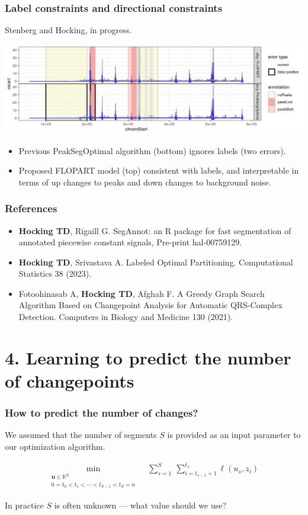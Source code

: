 \documentclass{beamer}
\newcommand{\RR}{\mathbb R}
\begin{document}
\begin{frame}
  \frametitle{Label constraints and directional constraints}
  Stenberg and Hocking, in progress.

  \includegraphics[width=\linewidth]{FLOPART-example}

  \begin{itemize}
  \item Previous PeakSegOptimal algorithm (bottom) ignores labels (two
    errors).
  \item Proposed FLOPART model (top) consistent with labels, and
    interpretable in terms of up changes to peaks and down changes to
    background noise.
  \end{itemize}
\end{frame}

\begin{frame}
  \frametitle{References}
  \scriptsize
  \begin{itemize}
  \item \textbf{Hocking TD}, Rigaill G. SegAnnot: an R package for
    fast segmentation of annotated piecewise constant signals,
    Pre-print hal-00759129.
  \item \textbf{Hocking TD}, Srivastava A. Labeled Optimal
    Partitioning. Computational Statistics 38 (2023).
  \item Fotoohinasab A, \textbf{Hocking TD}, Afghah F. A Greedy Graph
    Search Algorithm Based on Changepoint Analysis for Automatic
    QRS-Complex Detection. Computers in Biology and Medicine 130
    (2021).
  \end{itemize}
\end{frame}

\section{4. Learning to predict the number of changepoints}
 
\begin{frame}
  \frametitle{How to predict the number of changes?}

  We assumed that the number of segments $S$ is provided as an input
  parameter to our optimization algorithm.

\begin{align*}
\min_{\substack{
  \mathbf u\in\RR^{S}
\\
   0=t_0<t_1<\cdots<t_{S-1}<t_S=n
}} & \ \
    \sum_{s=1}^S\  \sum_{i=t_{s-1}+1}^{t_s} \ell( u_s,  z_i) 
  \nonumber
\end{align*}

In practice $S$ is often unknown --- what value should we use?

\end{frame}
\end{document}
